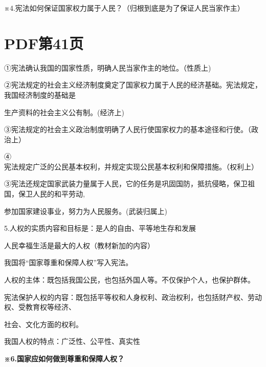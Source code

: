 \documentclass[lang=cn,11pt]{elegantbook}
\newcommand{\daofasym}[1]{{\daofasymbolfont #1}}
\newcommand{\daofasym}[1]{#1}
\begin{document}
※4.宪法如何保证国家权力属于人民？（归根到底是为了保证人民当家作主）\par


\section*{PDF第41页}

\daofasym{①}宪法确认我国的国家性质，明确人民当家作主的地位。（性质上)\par

\daofasym{②}宪法规定的社会主义经济制度奠定了国家权力属于人民的经济基础。宪法规定，我国经济制度的基础是\par

生产资料的社会主义公有制。(经济上)\par

\daofasym{③}宪法规定的社会主义政治制度明确了人民行使国家权力的基本途径和行使。（政治上）\par

\daofasym{④}宪法规定广泛的公民基本权利，并规定实现公民基本权利和保障措施。（权利上）\par

\daofasym{③}宪法还规定国家武装力量属于人民，它的任务是巩固国防，抵抗侵略，保卫祖国，保卫人民的和平劳动,\par

参加国家建设事业，努力为人民服务。(武装归属上)\par

5.人权的实质内容和目标是：是人的自由、平等地生存和发展\par

人民幸福生活是最大的人权（教材新加的内容）\par

我国将“国家尊重和保障人权”写入宪法。\par

人权的主体：既包括我国公民，也包括外国人等。不仅保护个人，也保护群体。\par

宪法保护人权的内容：既包括平等权和人身权利、政治权利，也包括财产权、劳动权、受教育权等经济、\par

社会、文化方面的权利。\par

我国人权的特点：广泛性、公平性、真实性\par

\textbf{※6.国家应如何做到尊重和保障人权？}\par
\end{document}
